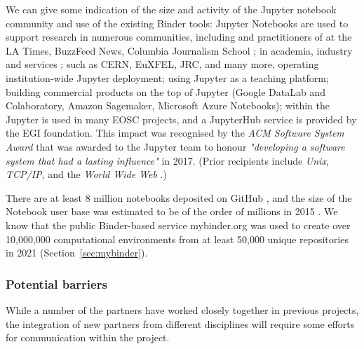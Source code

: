 We can give some indication of the size and activity of the Jupyter notebook
community and use of the existing Binder tools: Jupyter Notebooks are used to
support research in numerous communities, including
{} and practitioners of  at the LA Times, BuzzFeed News, Columbia Journalism School
\cite{latimes-datadesk} \cite{columbia-nytimes} \cite{data-journalism};
 in academia, industry and services \cite{Perkel2018};
{} such as CERN, EuXFEL, JRC, and many more,
operating institution-wide Jupyter deployment;
{} using Jupyter as a teaching platform;
{} building commercial products on the
top of Jupyter (Google DataLab and Colaboratory, Amazon Sagemaker, Microsoft Azure
Notebooks);
within the  Jupyter is used in many EOSC
projects, and a JupyterHub service is provided by the EGI foundation.
This impact was recognised by the \emph{ACM Software System Award} that was
awarded to the Jupyter team to honour \emph{"developing a software system that
had a lasting influence"} in 2017. (Prior recipients include \emph{Unix},
\emph{TCP/IP}, and the \emph{World Wide Web} \cite{acm-award}.)

There are at least 8 million notebooks deposited on GitHub \cite{notebookcount}, and
the size of the Notebook user base was estimated to be of the order of
millions in 2015 \cite{jupyter-grant}. We know that the public Binder-based service mybinder.org
was used to create over 10,000,000 computational environments
from at least 50,000 unique repositories in 2021 (Section~\ref{sec:mybinder}).



\subsubsection{Potential barriers}

While a number of the partners have worked closely together in previous
projects, the integration of new partners from different disciplines will
require some efforts for communication within the project.

